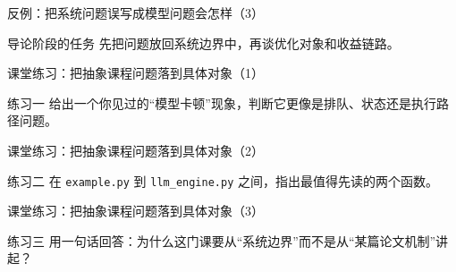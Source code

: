 \begin{frame}{反例：把系统问题误写成模型问题会怎样（3）}
  \begin{block}{导论阶段的任务}
    先把问题放回系统边界中，再谈优化对象和收益链路。
  \end{block}
\end{frame}

\begin{frame}{课堂练习：把抽象课程问题落到具体对象（1）}
  \begin{block}{练习一}
    给出一个你见过的“模型卡顿”现象，判断它更像是排队、状态还是执行路径问题。
  \end{block}
\end{frame}

\begin{frame}{课堂练习：把抽象课程问题落到具体对象（2）}
  \begin{block}{练习二}
    在 \texttt{example.py} 到 \texttt{llm\_engine.py} 之间，指出最值得先读的两个函数。
  \end{block}
\end{frame}

\begin{frame}{课堂练习：把抽象课程问题落到具体对象（3）}
  \begin{block}{练习三}
    用一句话回答：为什么这门课要从“系统边界”而不是从“某篇论文机制”讲起？
  \end{block}
\end{frame}
